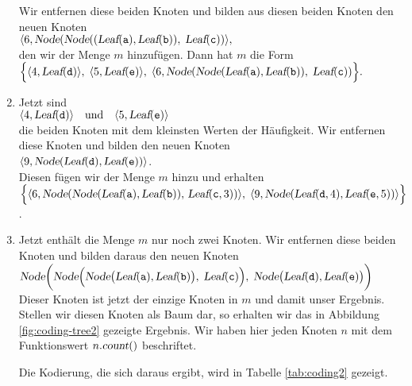 \begin{enumerate}
      Wir entfernen diese beiden Knoten und bilden aus diesen beiden Knoten den neuen Knoten
      \\[0.2cm]
      \hspace*{1.3cm}
      $ \langle 6, \textsl{Node}(
           \textsl{Node}((\textsl{Leaf}(\mathtt{a}), \textsl{Leaf}(\mathtt{b})),\; 
           \textsl{Leaf}(\mathtt{c}))\rangle, $
      \\[0.2cm]
      den wir der Menge $m$ hinzuf\"ugen.  Dann hat $m$ die Form
      \\[0.2cm]
      \hspace*{1.3cm}
      $ \Bigl\{ 
        \langle 4, \textsl{Leaf}(\mathtt{d}) \rangle,\;\langle 5, \textsl{Leaf}(\mathtt{e}) \rangle,\;
        \langle 6, \textsl{Node}(
           \textsl{Node}(\textsl{Leaf}(\mathtt{a}), \textsl{Leaf}(\mathtt{b})),\; 
           \textsl{Leaf}(\mathtt{c}))\Bigr\}. $
\item Jetzt sind 
      \\[0.2cm]
      \hspace*{1.3cm}
      $ \langle 4, \textsl{Leaf}(\mathtt{d}) \rangle \quad \mathrm{und} \quad \langle 5, \textsl{Leaf}(\mathtt{e}) \rangle$
      \\[0.2cm]
      die beiden Knoten mit dem kleinsten Werten der H\"aufigkeit.
      Wir entfernen diese Knoten und bilden den neuen Knoten \\[0.2cm]
      \hspace*{1.3cm}
      $\langle 9, \textsl{Node}(\textsl{Leaf}(\mathtt{d}), \textsl{Leaf}(\mathtt{e})) \rangle$.
      \\[0.2cm]
      Diesen f\"ugen wir der Menge $m$ hinzu und erhalten
      \\[0.2cm]
      \hspace*{1.3cm}
      $ \Bigl\{ 
        \langle 6, \textsl{Node}(
           \textsl{Node}(\textsl{Leaf}(\mathtt{a}),
           \textsl{Leaf}(\mathtt{b})),\,\textsl{Leaf}(\mathtt{c},3))
        \rangle,\;
        \langle 9,\textsl{Node}(\textsl{Leaf}(\mathtt{d},4), \textsl{Leaf}(\mathtt{e},5)) \rangle
        \Bigr\}
           $.      
\item Jetzt enth\"alt die Menge $m$ nur noch zwei Knoten.  Wir entfernen diese beiden Knoten und
      bilden daraus den neuen Knoten
      \\[0.2cm]
      \hspace*{1.3cm}
      $\textsl{Node}\biggl(
              \textsl{Node}\Bigl(
                 \textsl{Node}\bigl(\textsl{Leaf}(\mathtt{a}), \textsl{Leaf}(\mathtt{b})\bigr),\; 
                 \textsl{Leaf}(\mathtt{c})\Bigr),\;
              \textsl{Node}\bigl(\textsl{Leaf}(\mathtt{d}), \textsl{Leaf}(\mathtt{e})\bigr)
         \biggr)
      $
      \\[0.2cm]
      Dieser Knoten ist jetzt der einzige Knoten in $m$ und damit unser Ergebnis.
      Stellen wir diesen Knoten als Baum dar, so erhalten wir das in Abbildung
      \ref{fig:coding-tree2} gezeigte Ergebnis.  Wir haben hier jeden Knoten $n$
      mit dem Funktionswert  $n.\textsl{count}()$ beschriftet.  

      Die Kodierung, die sich daraus ergibt,
      wird in Tabelle \ref{tab:coding2} gezeigt.
\end{enumerate}

